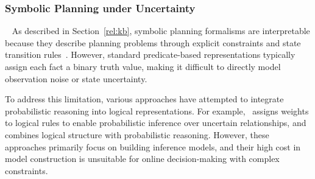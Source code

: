 \subsubsection{Symbolic Planning under Uncertainty}~\label{rel:pu_sym}
As described in Section~\ref{rel:kb}, symbolic planning formalisms are interpretable because they describe planning problems through explicit constraints and state transition rules~\cite{ghallab2016automated,lifschitz2019answer}. However, standard predicate-based representations typically assign each fact a binary truth value, making it difficult to directly model observation noise or state uncertainty.


To address this limitation, various approaches have attempted to integrate probabilistic reasoning into logical representations. For example,~\cite{richardson2006markov} assigns weights to logical rules to enable probabilistic inference over uncertain relationships, and~\cite{qu2019probabilistic} combines logical structure with probabilistic reasoning. However, these approaches primarily focus on building inference models, and their high cost in model construction is unsuitable for online decision-making with complex constraints. 


